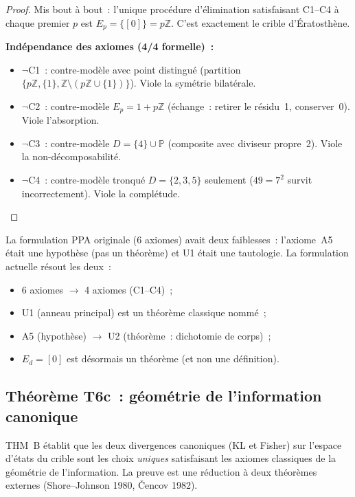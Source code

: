 \documentclass[12pt,a4paper]{article}
\begin{document}
\begin{theoreme}
\begin{proof}
\medskip
Mis bout à bout~: l'unique procédure d'élimination satisfaisant
C1--C4 à chaque premier $p$ est $E_p = \{[0]\} = p\mathbb{Z}$. C'est
exactement le crible d'Ératosthène.

\textbf{Indépendance des axiomes (4/4 formelle)~:}
\begin{itemize}
\item $\neg$C1~: contre-modèle avec point distingué (partition
  $\{p\mathbb{Z}, \{1\}, \mathbb{Z}\setminus(p\mathbb{Z}\cup\{1\})\}$).
  Viole la symétrie bilatérale.
\item $\neg$C2~: contre-modèle $E_p = 1 + p\mathbb{Z}$ (échange~:
  retirer le résidu~1, conserver~0). Viole l'absorption.
\item $\neg$C3~: contre-modèle $D = \{4\} \cup \mathbb{P}$ (composite
  avec diviseur propre~2). Viole la non-décomposabilité.
\item $\neg$C4~: contre-modèle tronqué $D = \{2,3,5\}$ seulement
  ($49 = 7^2$ survit incorrectement). Viole la complétude.
\end{itemize}
\end{proof}
\end{theoreme}

\begin{remarque}
La formulation PPA originale (6 axiomes) avait deux faiblesses~:
l'axiome~A5 était une hypothèse (pas un théorème) et U1 était une
tautologie. La formulation actuelle résout les deux~:
\begin{itemize}
\item 6 axiomes $\to$ 4 axiomes (C1--C4)~;
\item U1 (anneau principal) est un théorème classique nommé~;
\item A5 (hypothèse) $\to$ U2 (théorème~: dichotomie de corps)~;
\item $E_d = [0]$ est désormais un théorème (et non une définition).
\end{itemize}
\end{remarque}

\subsection{Théorème T6c~: géométrie de l'information canonique}
\label{sec:T6_geometry}

THM~B établit que les deux divergences canoniques (KL et Fisher) sur
l'espace d'états du crible sont les choix \emph{uniques} satisfaisant
les axiomes classiques de la géométrie de l'information. La preuve
est une réduction à deux théorèmes externes
(Shore--Johnson 1980, \v{C}encov 1982).
\end{document}
